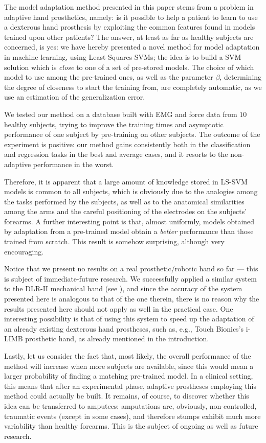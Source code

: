 The model adaptation method presented in this paper stems from a
problem in adaptive hand prosthetics, namely: is it possible to help a
patient to learn to use a dexterous hand prosthesis 
by exploiting the common features found in models trained upon other
patients?
The answer, at least as far as healthy subjects are concerned, is yes:
we have hereby presented a novel method for model adaptation in
machine learning, using Least-Squares SVMs; the idea is to build a SVM
solution which is \emph{close} to one of a set of pre-stored
models. The choice of which model to use among the pre-trained ones,
as well as the parameter $\beta$, determining the degree of closeness
to start the training from, are completely automatic, as we use an
estimation of the generalization error.

We tested our method on a database built with EMG and force data from
$10$ healthy subjects, trying to improve the training times and
asymptotic performance of one subject by pre-training on other
subjects. The outcome of the experiment is positive: our method gains
consistently both in the classification and regression tasks in the
best and average cases, and it resorts to the non-adaptive performance
in the worst.

Therefore, it is apparent that a large amount of knowledge stored in
LS-SVM models is common to all subjects, which is obviously due to the
analogies among the tasks performed by the subjects, as well as to the
anatomical similarities among the arms and the careful positioning of
the electrodes on the subjects' forearms. A further interesting point
is that, almost uniformly, models obtained by adaptation from a
pre-trained model obtain a \emph{better} performance than those
trained from scratch. This result is somehow surprising, although very
encouraging.

Notice that we present no results on a real prosthetic/robotic hand so far --- this is subject of immediate-future research. We successfully applied a similar system to the DLR-II mechanical hand (see \cite{2008.ICRA,2008.BioCyb}), and since the accuracy of the system presented here is analogous to that of the one therein, there is no reason why the results presented here should not apply as well in the practical case. One interesting possibility is that of using this system to speed up the adaptation of an already existing dexterous hand prostheses, such as, e.g., Touch Bionics's i-LIMB \cite{ilimb} prosthetic hand, as already mentioned in the introduction.

Lastly, let us consider the fact that, most likely, the overall
performance of the method will increase when more subjects are
available, since this would mean a larger probability of finding a
matching pre-trained model. In a clinical setting, this means that
after an experimental phase, adaptive prostheses employing this method
could actually be built. It remains, of course, to discover whether
this idea can be transferred to amputees: amputations are, obviously,
non-controlled, traumatic events (except in some cases), and therefore
stumps exhibit much more variability than healthy forearms. This is
the subject of ongoing as well as future research.
